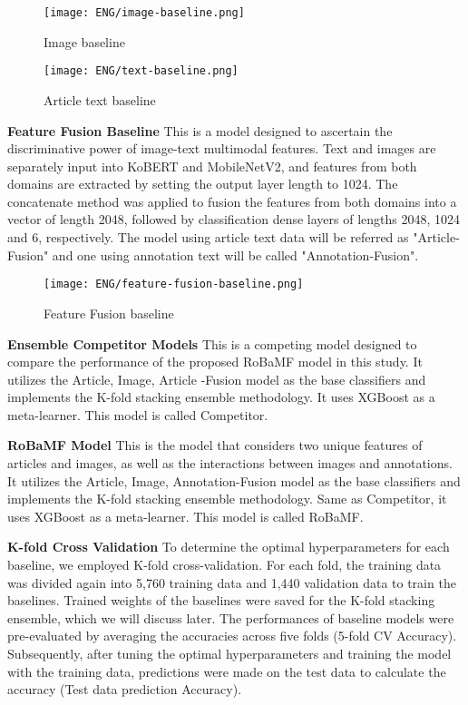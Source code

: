 \documentclass{article}
\begin{document}
%
\begin{figure}[ht]
    \centering
    \begin{minipage}{0.48\textwidth}
        \centering
        \texttt{[image: ENG/image-baseline.png]} %
        \caption{Image baseline}
        \label{fig.2}
        
    \end{minipage}\hfill
    \begin{minipage}{0.48\textwidth}
        \centering
        \texttt{[image: ENG/text-baseline.png]} %
        \caption{Article text baseline}
        \label{fig.3}
    \end{minipage}
\end{figure}
%

\textbf{Feature Fusion Baseline}\quad
This is a model designed to ascertain the discriminative power of image-text multimodal features. 
Text and images are separately input into KoBERT and MobileNetV2, and features from both domains are extracted by setting the output layer length to 1024. 
The concatenate method was applied to fusion the features from both domains into a vector of length 2048, followed by classification dense layers of lengths 2048, 1024 and 6, respectively.
The model using article text data will be referred as "Article-Fusion" and one using annotation text will be called "Annotation-Fusion".

\begin{figure}[ht]
    \centering
    \texttt{[image: ENG/feature-fusion-baseline.png]}
    \caption{Feature Fusion baseline}
    \label{fig.4}
\end{figure}

\textbf{Ensemble Competitor Models}\quad
This is a competing model designed to compare the performance of the proposed RoBaMF model in this study. It utilizes the Article, Image, Article -Fusion model as the base classifiers and implements the K-fold stacking ensemble methodology. It uses XGBoost as a meta-learner. This model is called Competitor.


\textbf{RoBaMF Model}\quad
This is the model that considers two unique features of articles and images, as well as the interactions between images and annotations. It utilizes the Article, Image, Annotation-Fusion model as the base classifiers and implements the K-fold stacking ensemble methodology. Same as Competitor, it uses XGBoost as a meta-learner. This model is called RoBaMF.


\textbf{K-fold Cross Validation}\quad
To determine the optimal hyperparameters for each baseline, we employed K-fold cross-validation. For each fold, the training data was divided again into 5,760 training data and 1,440 validation data to train the baselines. Trained weights of the baselines were saved for the K-fold stacking ensemble, which we will discuss later. The performances of baseline models were pre-evaluated by averaging the accuracies across five folds (5-fold CV Accuracy). Subsequently, after tuning the optimal hyperparameters and training the model with the training data, predictions were made on the test data to calculate the accuracy (Test data prediction Accuracy).
\end{document}
